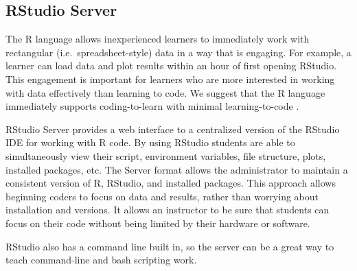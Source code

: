 \subsection{RStudio Server}\label{subsub:RStudio}

The R language allows inexperienced learners to immediately work with rectangular (i.e.\ spreadsheet-style) data in a way that is engaging. For example, a learner can load data and plot results within an hour of first opening RStudio. This engagement is important for learners who are more interested in working with data effectively than learning to code. We suggest that the R language immediately supports coding-to-learn with minimal learning-to-code \citep{}.

RStudio Server provides a web interface to a centralized version of the RStudio IDE for working with R code. By using RStudio students are able to simultaneously view their script, environment variables, file structure, plots, installed packages, etc. The Server format allows the administrator to maintain a consistent version of R, RStudio, and installed packages. This approach allows beginning coders to focus on data and results, rather than worrying about installation and versions. It allows an instructor to be sure that students can focus on their code without being limited by their hardware or software.
 

RStudio also has a command line built in, so the server can be a great way to teach command-line and bash scripting work.

